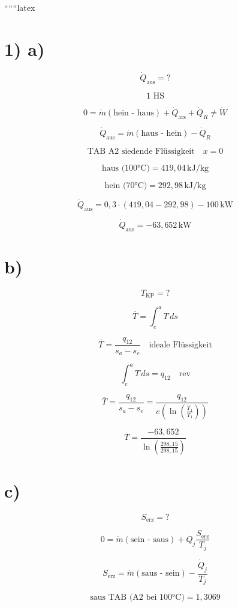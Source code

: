 
``````latex


\section*{1) a)}

\[
\dot{Q}_{\text{aus}} = ?
\]

\[
1 \text{ HS}
\]

\[
0 = \dot{m} (\text{hein - haus}) + \dot{Q}_{\text{ars}} + \dot{Q}_R \neq \dot{W}
\]

\[
\dot{Q}_{\text{aus}} = \dot{m} (\text{haus - hein}) - \dot{Q}_R
\]

\[
\text{TAB A2 siedende Flüssigkeit} \quad x = 0
\]

\[
\text{haus (100°C)} = 419{,}04 \, \text{kJ/kg}
\]

\[
\text{hein (70°C)} = 292{,}98 \, \text{kJ/kg}
\]

\[
\dot{Q}_{\text{aus}} = 0{,}3 \cdot (419{,}04 - 292{,}98) - 100 \, \text{kW}
\]

\[
\dot{Q}_{\text{aus}} = -63{,}652 \, \text{kW}
\]

\section*{b)}

\[
T_{\text{KP}} = ?
\]

\[
\overline{T} = \int_{e}^{a} T \, ds
\]

\[
\overline{T} = \frac{q_{12}}{s_{a} - s_{e}} \quad \text{ideale Flüssigkeit}
\]

\[
\int_{e}^{a} T \, ds = q_{12} \quad \text{rev}
\]

\[
\overline{T} = \frac{q_{12}}{s_{a} - s_{e}} = \frac{q_{12}}{e \left( \ln \left( \frac{T_1}{T_1} \right) \right)}
\]

\[
\overline{T} = \frac{-63{,}652}{\ln \left( \frac{298{,}15}{298{,}15} \right)}
\]

\section*{c)}

\[
S_{\text{erz}} = ?
\]

\[
0 = \dot{m} (\text{sein - saus}) + \dot{Q}_j \frac{S_{\text{erz}}}{T_j}
\]

\[
S_{\text{erz}} = \dot{m} (\text{saus - sein}) - \frac{\dot{Q}_j}{T_j}
\]

\[
\text{saus TAB (A2 bei 100°C)} = 1{,}3069
\]

